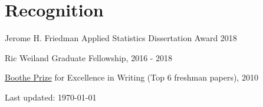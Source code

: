 \documentclass[letterpaper]{article}
\def\footerlink{}
\renewenvironment{itemize}{
  \begin{list}{}{
    \setlength{\leftmargin}{1.5em}
  }
}{
  \end{list}
}
\begin{document}
\section*{Recognition}
\begin{itemize}
\item Jerome H. Friedman Applied Statistics Dissertation Award 2018
\item Ric Weiland Graduate Fellowship, 2016 - 2018
\item \href{https://undergrad.stanford.edu/programs/pwr/publications-prizes-and-awards/boothe-prize-essays}{Boothe Prize} for Excellence in Writing (Top 6 freshman papers), 2010
\end{itemize}

\begin{center}
  \begin{footnotesize}
    Last updated: \today \\
    \href{\footerlink}{\texttt{\footerlink}}
  \end{footnotesize}
\end{center}
\end{document}
